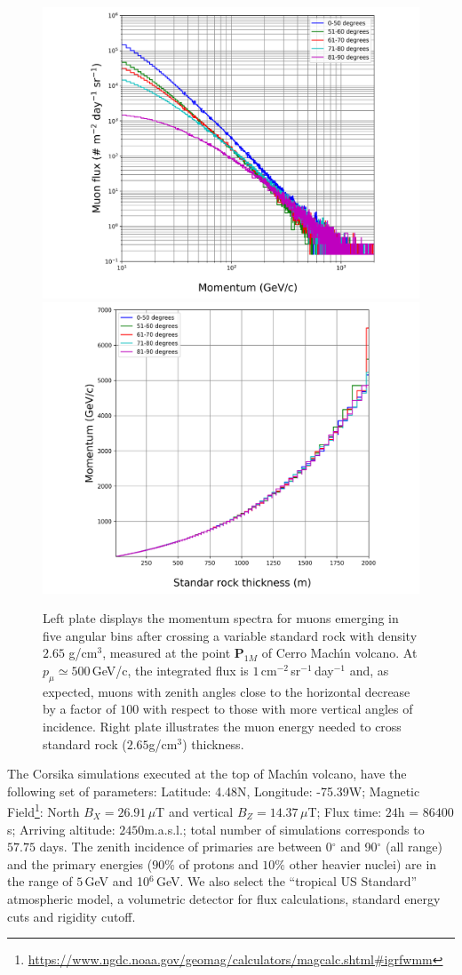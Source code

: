 \documentclass[letterpaper,10pt,titlepage,linenumber]{article}
\begin{document}
\begin{figure}[!ht]
\centering
{\includegraphics[width=0.49 \textwidth]{Figures/flujo_vs_p}}
{\includegraphics[width=0.49 \textwidth]{Figures/p_vs_x}}
	\caption{Left plate displays the momentum spectra for muons  emerging in five angular bins after crossing a variable standard rock with density $2.65$ g/cm$^3$, measured at the point {\bf P$_{1M}$} of Cerro Mach\'{\i}n volcano. At $p_\mu \simeq 500$\,GeV/c, the integrated flux is $1$\,cm$^{-2}$\,sr$^{-1}$\,day$^{-1}$ and, as expected, muons with zenith angles close to the horizontal decrease by a factor of $100$ with respect to those with more vertical angles of incidence. Right plate illustrates the muon energy needed to cross standard rock ($2.65$g/cm$^3$) thickness.} 
  \label{fig:fluxvsp}
\end{figure}


The {\sc Corsika} simulations executed at the top of Mach\'{\i}n volcano, have the following set of parameters: Latitude: 4.48N, Longitude: -75.39W; Magnetic Field\footnote{ \url{https://www.ngdc.noaa.gov/geomag/calculators/magcalc.shtml\#igrfwmm}}: North $B_{X} = 26.91\, \mu$T  and vertical $B_{Z} = 14.37 \, \mu$T; Flux time: $24$h = $86400$s; Arriving altitude: $2450$m.a.s.l.; total number of simulations corresponds to $57.75$ days. The zenith incidence of primaries are between 0$^{\circ}$ and 90$^{\circ}$ (all range) and the primary energies ($90\%$ of protons and $10\%$ other heavier nuclei) are in the range of $5\,$GeV and 10$^6\,$GeV. We also select the ``tropical US Standard'' atmospheric model, a volumetric detector for flux calculations, standard energy cuts and rigidity cutoff.
\end{document}

